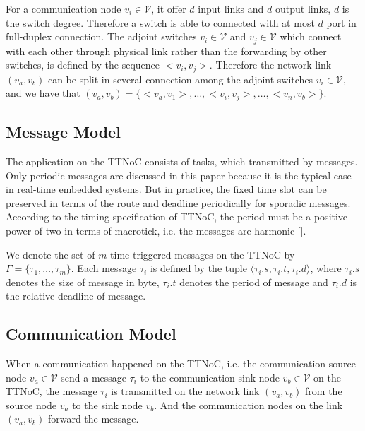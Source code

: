 \documentclass[conference]{IEEEtran}
\begin{document}
For a communication node $ \mathit{v}_{i}\in\mathcal{V} $, it offer $\mathit{d}$ input links and $\mathit{d}$ output links, $\mathit{d}$ is the switch degree. Therefore a switch is able to connected with at most $ \mathit{d} $ port in full-duplex connection. The adjoint switches $v_{i}\in\mathcal{V}$ and $v_{j}\in\mathcal{V}$ which connect with each other through physical link rather than the forwarding by other switches, is defined by the sequence $ <v_{i},v_{j}> $. Therefore the network link $(v_{a},v_{b})$ can be split in several connection among the adjoint switches  $v_{i}\in\mathcal{V}$, and we have that 
$ (v_{a},v_{b})=\{ <v_{a},v_{1}> ,\dots, <v_{i},v_{j}> ,\dots, <v_{n},v_{b}> \} $.

\subsection{Message Model}

The application on the TTNoC consists of tasks, which transmitted by messages. Only periodic messages are discussed in this paper because it is the typical case in real-time embedded systems. But in practice, the fixed time slot can be preserved in terms of the route and deadline periodically for sporadic messages. According to the timing specification of TTNoC, the period must be a positive power of two in terms of macrotick, i.e. the messages are harmonic [].

We denote the set of $ \mathit{m} $ time-triggered messages on the TTNoC by $\Gamma = \{\tau_{1},\dots,\tau_{m} \}$. Each message $\tau_{i}$ is defined by the tuple $\langle \tau_{i}.s, \tau_{i}.t, \tau_{i}.d\rangle$, where $\tau_{i}.s$ denotes the size of message in byte, $\tau_{i}.t$ denotes the period of message and $\tau_{i}.d$ is the relative deadline of message.

\subsection{Communication Model}

When a communication happened on the TTNoC, i.e. the communication source node $v_{a}\in \mathcal{V}$ send a message $\tau_{i}$ to the communication sink node $v_{b}\in \mathcal{V}$ on the TTNoC, the message $\tau_{i}$ is transmitted on the network link $(v_{a},v_{b})$ from the source node $v_{a}$ to the sink node $v_{b}$. And the communication nodes on the link $(v_{a},v_{b})$ forward the message.
\end{document}

